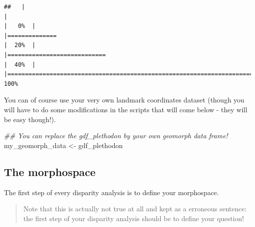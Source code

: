 \documentclass[]{book}
\newenvironment{Shaded}{\begin{snugshade}}{\end{snugshade}}
\newcommand{\CommentTok}[1]{\textcolor[rgb]{0.56,0.35,0.01}{\textit{#1}}}
\newcommand{\DataTypeTok}[1]{\textcolor[rgb]{0.13,0.29,0.53}{#1}}
\newcommand{\KeywordTok}[1]{\textcolor[rgb]{0.13,0.29,0.53}{\textbf{#1}}}
\newcommand{\NormalTok}[1]{#1}
\newcommand{\OperatorTok}[1]{\textcolor[rgb]{0.81,0.36,0.00}{\textbf{#1}}}
\newcommand{\StringTok}[1]{\textcolor[rgb]{0.31,0.60,0.02}{#1}}
\begin{document}
\begin{verbatim}
##   |                                                                              |                                                                      |   0%  |                                                                              |==============                                                        |  20%  |                                                                              |============================                                          |  40%  |                                                                              |======================================================================| 100%
\end{verbatim}

\begin{Shaded}
\end{Shaded}

You can of course use your very own landmark coordinates dataset (though you will have to do some modifications in the scripts that will come below - they will be easy though!).

\begin{Shaded}
\begin{Highlighting}[]
\CommentTok{## You can replace the gdf_plethodon by your own geomorph data frame!}
\NormalTok{my_geomorph_data <-}\StringTok{ }\NormalTok{gdf_plethodon}
\end{Highlighting}
\end{Shaded}

\hypertarget{the-morphospace-1}{%
\subsection{The morphospace}\label{the-morphospace-1}}

The first step of every disparity analysis is to define your morphospace.

\begin{quote}
Note that this is actually not true at all and kept as a erroneous sentence: the first step of your disparity analysis should be to define your question!
\end{quote}
\end{document}
